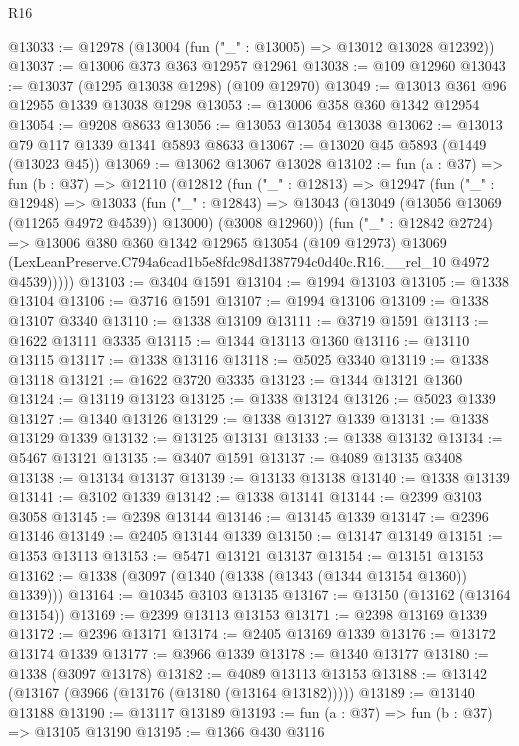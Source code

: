 \begin{lexlean}{R16}
\begin{coremodule}
@13033 := @12978 (@13004 (fun ("_" : @13005) => @13012 @13028 @12392))
@13037 := @13006 @373 @363 @12957 @12961
@13038 := @109 @12960
@13043 := @13037 (@1295 @13038 @1298) (@109 @12970)
@13049 := @13013 @361 @96 @12955 @1339 @13038 @1298
@13053 := @13006 @358 @360 @1342 @12954
@13054 := @9208 @8633
@13056 := @13053 @13054 @13038
@13062 := @13013 @79 @117 @1339 @1341 @5893 @8633
@13067 := @13020 @45 @5893 (@1449 (@13023 @45))
@13069 := @13062 @13067 @13028
@13102 := fun (a : @37) =>
  fun (b : @37) =>
  @12110
    (@12812
      (fun ("_" : @12813) =>
      @12947
        (fun ("_" : @12948) =>
        @13033
          (fun ("_" : @12843) =>
          @13043 (@13049 (@13056 @13069 (@11265 @4972 @4539)) @13000) (@3008 @12960))
          (fun ("_" : @12842 @2724) =>
          @13006
            @380
            @360
            @1342
            @12965
            @13054
            (@109 @12973)
            @13069
            (LexLeanPreserve.C794a6cad1b5e8fdc98d1387794c0d40c.R16.__rel_10 @4972 @4539)))))
@13103 := @3404 @1591
@13104 := @1994 @13103
@13105 := @1338 @13104
@13106 := @3716 @1591
@13107 := @1994 @13106
@13109 := @1338 @13107 @3340
@13110 := @1338 @13109
@13111 := @3719 @1591
@13113 := @1622 @13111 @3335
@13115 := @1344 @13113 @1360
@13116 := @13110 @13115
@13117 := @1338 @13116
@13118 := @5025 @3340
@13119 := @1338 @13118
@13121 := @1622 @3720 @3335
@13123 := @1344 @13121 @1360
@13124 := @13119 @13123
@13125 := @1338 @13124
@13126 := @5023 @1339
@13127 := @1340 @13126
@13129 := @1338 @13127 @1339
@13131 := @1338 @13129 @1339
@13132 := @13125 @13131
@13133 := @1338 @13132
@13134 := @5467 @13121
@13135 := @3407 @1591
@13137 := @4089 @13135 @3408
@13138 := @13134 @13137
@13139 := @13133 @13138
@13140 := @1338 @13139
@13141 := @3102 @1339
@13142 := @1338 @13141
@13144 := @2399 @3103 @3058
@13145 := @2398 @13144
@13146 := @13145 @1339
@13147 := @2396 @13146
@13149 := @2405 @13144 @1339
@13150 := @13147 @13149
@13151 := @1353 @13113
@13153 := @5471 @13121 @13137
@13154 := @13151 @13153
@13162 := @1338 (@3097 (@1340 (@1338 (@1343 (@1344 @13154 @1360)) @1339)))
@13164 := @10345 @3103 @13135
@13167 := @13150 (@13162 (@13164 @13154))
@13169 := @2399 @13113 @13153
@13171 := @2398 @13169 @1339
@13172 := @2396 @13171
@13174 := @2405 @13169 @1339
@13176 := @13172 @13174 @1339
@13177 := @3966 @1339
@13178 := @1340 @13177
@13180 := @1338 (@3097 @13178)
@13182 := @4089 @13113 @13153
@13188 := @13142 (@13167 (@3966 (@13176 (@13180 (@13164 @13182)))))
@13189 := @13140 @13188
@13190 := @13117 @13189
@13193 := fun (a : @37) => fun (b : @37) => @13105 @13190
@13195 := @1366 @430 @3116

\end{coremodule}
\end{lexlean}
